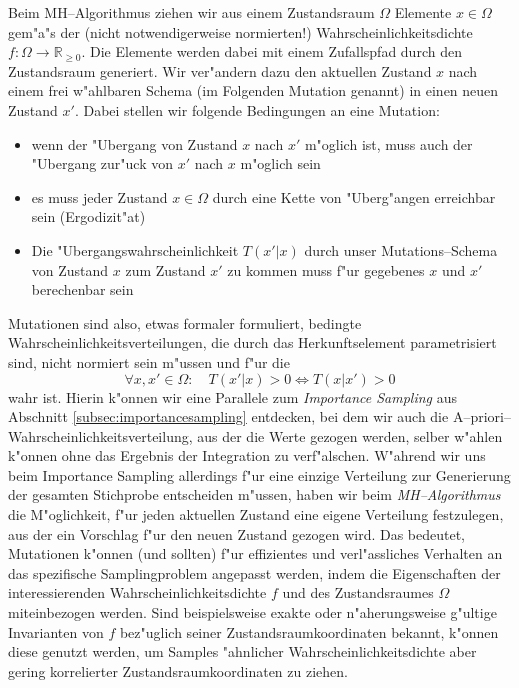 	Beim MH--Algorithmus ziehen wir aus einem Zustandsraum $\Omega$ Elemente $x \in \Omega$ gem"a"s der (nicht notwendigerweise normierten!) Wahrscheinlichkeitsdichte $f : \Omega \rightarrow \mathbb{R}_{\geq 0}$. Die Elemente werden dabei mit einem Zufallspfad durch den Zustandsraum generiert. Wir ver"andern dazu den aktuellen Zustand $x$ nach einem frei w"ahlbaren Schema (im Folgenden Mutation genannt) in einen neuen Zustand $x'$.
	Dabei stellen wir folgende Bedingungen an eine Mutation:
	\begin{itemize}
		\item{wenn der "Ubergang von Zustand $x$ nach $x'$ m"oglich ist, muss auch der "Ubergang zur"uck von $x'$ nach $x$ m"oglich sein}
		\item{es muss jeder Zustand $x \in \Omega$ durch eine Kette von "Uberg"angen erreichbar sein (Ergodizit"at)}
		\item{Die "Ubergangswahrscheinlichkeit $T(x'|x)$ durch unser Mutations--Schema von Zustand $x$ zum Zustand $x'$ zu kommen muss f"ur gegebenes $x$ und $x'$ berechenbar sein}
	\end{itemize}
	Mutationen sind also, etwas formaler formuliert, bedingte Wahrscheinlichkeitsverteilungen, die durch das Herkunftselement parametrisiert sind, nicht normiert sein m"ussen und f"ur die
	$$\forall x,x'\in\Omega : \quad T(x'|x)>0 \Leftrightarrow T(x|x')>0$$
	wahr ist. Hierin k"onnen wir eine Parallele zum {\em Importance Sampling} aus Abschnitt \ref{subsec:importancesampling} entdecken, bei dem wir auch die A--priori--Wahr\-schein\-lich\-keits\-ver\-tei\-lung, aus der die Werte gezogen werden, selber w"ahlen k"onnen ohne das Ergebnis der Integration zu verf"alschen. W"ahrend wir uns beim Importance Sampling allerdings f"ur eine einzige Verteilung zur Generierung der gesamten Stichprobe entscheiden m"ussen, haben wir beim {\em MH--Algorithmus} die M"oglichkeit, f"ur jeden aktuellen Zustand eine eigene Verteilung festzulegen, aus der ein Vorschlag f"ur den neuen Zustand gezogen wird.
	Das bedeutet, Mutationen k"onnen (und sollten) f"ur effizientes und verl"assliches Verhalten an das spezifische Samplingproblem angepasst werden, indem die Eigenschaften der interessierenden Wahrscheinlichkeitsdichte $f$ und des Zustandsraumes $\Omega$ miteinbezogen werden. Sind beispielsweise exakte oder n"aherungsweise g"ultige Invarianten von $f$ bez"uglich seiner Zustandsraumkoordinaten bekannt, k"onnen diese genutzt werden, um Samples "ahnlicher Wahrscheinlichkeitsdichte aber gering korrelierter Zustandsraumkoordinaten zu ziehen.
	
